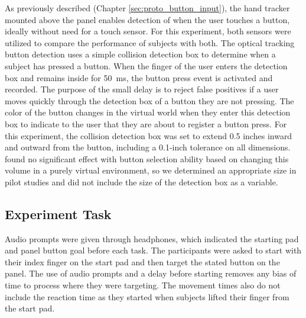 As previously described (Chapter \ref{sec:proto_button_input}), the hand tracker mounted above the panel enables detection of when the user touches a button, ideally without need for a touch sensor.
For this experiment, both sensors were utilized to compare the performance of subjects with both.
The optical tracking button detection uses a simple collision detection box to determine when a subject has pressed a button.
When the finger of the user enters the detection box and remains inside for \SI{50}{\milli\second}, the button press event is activated and recorded.
The purpose of the small delay is to reject false positives if a user moves quickly through the detection box of a button they are not pressing.
The color of the button changes in the virtual world when they enter this detection box to indicate to the user that they are about to register a button press.
For this experiment, the collision detection box was set to extend 0.5 inches inward and outward from the button, including a 0.1-inch tolerance on all dimensions.
\citet{aslandere_virtual_2015} found no significant effect with button selection ability based on changing this volume in a purely virtual environment, so we determined an appropriate size in pilot studies and did not include the size of the detection box as a variable.

\subsection{Experiment Task}

Audio prompts were given through headphones, which indicated the starting pad and panel button goal before each task.
The participants were asked to start with their index finger on the start pad and then target the stated button on the panel.
The use of audio prompts and a delay before starting removes any bias of time to process where they were targeting.
The movement times also do not include the reaction time as they started when subjects lifted their finger from the start pad.

